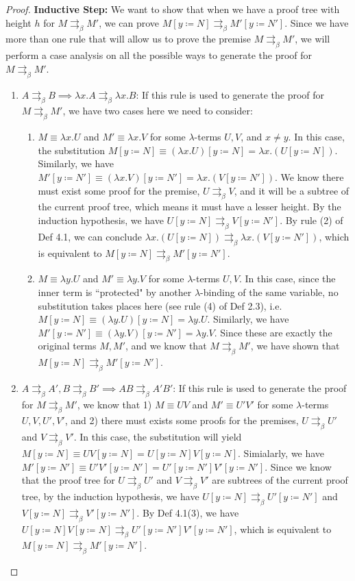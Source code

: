 \documentclass[a4paper,11pt]{article}
\theoremstyle{definition}
\theoremstyle{example}
\theoremstyle{lemma}
\newcommand{\lamterm}[2]{\lambda #1. #2}
\newcommand{\subs}[3]{#1[#2\coloneqq#3]}
\newcommand{\pbr}{\rightrightarrows_{\beta}}
\begin{document}
\begin{proof}
\textbf{Inductive Step: }We want to show that when we have a proof tree with height $h$ for $M \pbr M'$, we can prove $\subs{M}{y}{N} \pbr \subs{M'}{y}{N'}$. Since we have more than one rule that will allow us to prove the premise $M \pbr M'$, we will perform a case analysis on all the possible ways to generate the proof for $M \pbr M'$.
\begin{enumerate}[topsep=2pt,itemsep=-0.5ex,partopsep=1ex,parsep=1ex]
    \item $A \pbr B \implies \lamterm{x}{A} \pbr \lamterm{x}{B}$: If this rule is used to generate the proof for $M \pbr M'$, we have two cases here we need to consider:
    \begin{enumerate}[topsep=-4pt,itemsep=-0.5ex,partopsep=1ex,parsep=1ex]
        \item $M \equiv \lamterm{x}{U}$ and $M' \equiv \lamterm{x}{V}$ for some $\lambda$-terms $U,V$, and $x \neq y$. In this case, the substitution $\subs{M}{y}{N} \equiv \subs{(\lamterm{x}{U})}{y}{N} = \lamterm{x}{(\subs{U}{y}{N})}$. Similarly, we have $\subs{M'}{y}{N'} \equiv \subs{(\lamterm{x}{V})}{y}{N'} = \lamterm{x}{(\subs{V}{y}{N'})}$. We know there must exist some proof for the premise, $U \pbr V$, and it will be a subtree of the current proof tree, which means it must have a lesser height. By the induction hypothesis, we have $\subs{U}{y}{N} \pbr \subs{V}{y}{N'}$. By rule (2) of Def 4.1, we can conclude $\lamterm{x}{(\subs{U}{y}{N})} \pbr \lamterm{x}{(\subs{V}{y}{N'})}$, which is equivalent to $\subs{M}{y}{N} \pbr \subs{M'}{y}{N'}$.
        \item $M \equiv \lamterm{y}{U}$ and $M' \equiv \lamterm{y}{V}$ for some $\lambda$-terms $U,V$. In this case, since the inner term is ``protected" by another $\lambda$-binding of the same variable, no substitution takes places here (see rule (4) of Def 2.3), i.e. $\subs{M}{y}{N} \equiv \subs{(\lamterm{y}{U})}{y}{N} = \lamterm{y}{U}$. Similarly, we have $\subs{M'}{y}{N'} \equiv \subs{(\lamterm{y}{V})}{y}{N'} = \lamterm{y}{V}$. Since these are exactly the original terms $M, M'$, and we know that $M \pbr M'$, we have shown that $\subs{M}{y}{N} \pbr \subs{M'}{y}{N'}$.
    \end{enumerate}
    \item $A \pbr A', B \pbr B' \implies AB \pbr A'B'$: If this rule is used to generate the proof for $M \pbr M'$, we know that 1) $M \equiv UV$ and $M' \equiv U'V'$ for some $\lambda$-terms $U, V, U', V'$, and 2) there must exists some proofs for the premises, $U \pbr U'$ and $V \pbr V'$. In this case, the substitution will yield $\subs{M}{y}{N} \equiv \subs{UV}{y}{N} = \subs{U}{y}{N}\subs{V}{y}{N}$. Simialarly, we have $\subs{M'}{y}{N'} \equiv \subs{U'V'}{y}{N'} = \subs{U'}{y}{N'}\subs{V'}{y}{N'}$. Since we know that the proof tree for $U \pbr U'$ and $V \pbr V'$ are subtrees of the current proof tree, by the induction hypothesis, we have $\subs{U}{y}{N} \pbr \subs{U'}{y}{N'}$ and $\subs{V}{y}{N} \pbr \subs{V'}{y}{N'}$. By Def 4.1(3), we have $\subs{U}{y}{N}\subs{V}{y}{N} \pbr \subs{U'}{y}{N'}\subs{V'}{y}{N'}$, which is equivalent to $\subs{M}{y}{N} \pbr \subs{M'}{y}{N'}$.

\end{enumerate}
\end{proof}
\end{document}
